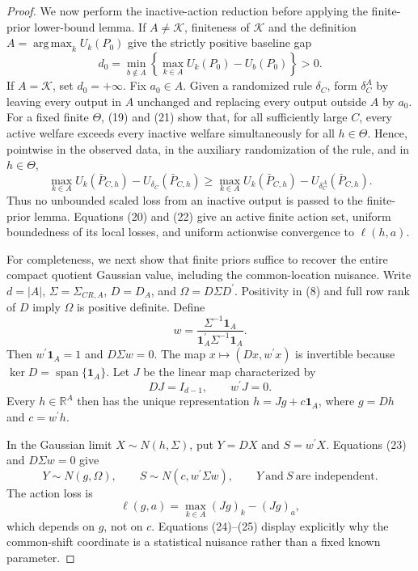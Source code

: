 \documentclass{article}
\begin{document}
\begin{proof}
We now perform the inactive-action reduction before applying the finite-prior lower-bound lemma.  If \(A\ne\mathcal K\), finiteness of \(\mathcal K\) and the definition \(A=\operatorname*{arg\,max}_kU_k(P_0)\) give the strictly positive baseline gap
\[
 d_0=\min_{b\notin A}\left\{
        \max_{k\in A}U_k(P_0)-U_b(P_0)\right\}>0.               \tag{21}
\]
If \(A=\mathcal K\), set \(d_0=+\infty\).  Fix \(a_0\in A\).  Given a randomized rule \(\delta_C\), form \(\delta_C^A\) by leaving every output in \(A\) unchanged and replacing every output outside \(A\) by \(a_0\).  For a fixed finite \(\Theta\), (19) and (21) show that, for all sufficiently large \(C\), every active welfare exceeds every inactive welfare simultaneously for all \(h\in\Theta\).  Hence, pointwise in the observed data, in the auxiliary randomization of the rule, and in \(h\in\Theta\),
\[
 \max_{k\in A}U_k(\bar P_{C,h})-U_{\delta_C}(\bar P_{C,h})
 \geq
 \max_{k\in A}U_k(\bar P_{C,h})-U_{\delta_C^A}(\bar P_{C,h}).   \tag{22}
\]
Thus no unbounded scaled loss from an inactive output is passed to the finite-prior lemma.  Equations (20) and (22) give an active finite action set, uniform boundedness of its local losses, and uniform actionwise convergence to \(\ell(h,a)\).

For completeness, we next show that finite priors suffice to recover the entire compact quotient Gaussian value, including the common-location nuisance.  Write \(d=|A|\), \(\Sigma=\Sigma_{CR,A}\), \(D=D_A\), and \(\Omega=D\Sigma D^{\prime}\).  Positivity in (8) and full row rank of \(D\) imply \(\Omega\) is positive definite.  Define
\[
 w=\frac{\Sigma^{-1}\mathbf1_A}
         {\mathbf1_A^{\prime}\Sigma^{-1}\mathbf1_A}.
\]
Then \(w^{\prime}\mathbf1_A=1\) and \(D\Sigma w=0\).  The map
\(x\mapsto(Dx,w^{\prime}x)\) is invertible because \(\ker D=\operatorname{span}\{\mathbf1_A\}\).  Let \(J\) be the linear map characterized by
\[
 DJ=I_{d-1},\qquad w^{\prime}J=0.                                \tag{23}
\]
Every \(h\in\mathbb R^A\) then has the unique representation
\(h=Jg+c\mathbf1_A\), where \(g=Dh\) and \(c=w^{\prime}h\).

In the Gaussian limit \(X\sim N(h,\Sigma)\), put \(Y=DX\) and \(S=w^{\prime}X\).  Equations (23) and \(D\Sigma w=0\) give
\[
 Y\sim N(g,\Omega),\qquad
 S\sim N\!\left(c,w^{\prime}\Sigma w\right),
 \qquad Y\ \text{and}\ S\ \text{are independent}.            \tag{24}
\]
The action loss is
\[
 \ell(g,a)=\max_{k\in A}(Jg)_k-(Jg)_a,                          \tag{25}
\]
which depends on \(g\), not on \(c\).  Equations (24)--(25) display explicitly why the common-shift coordinate is a statistical nuisance rather than a fixed known parameter.


\end{proof}
\end{document}
